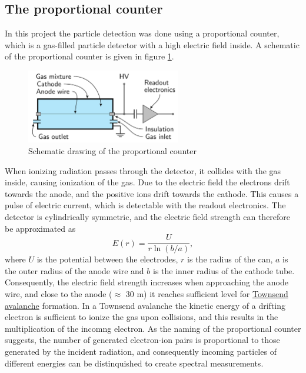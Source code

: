 \documentclass[a4paper]{article}
\begin{document}
\subsection{The proportional counter}
\label{counter}

In this project the particle detection was done using a proportional counter, which is a gas-filled particle detector with a high electric field inside.
\cite{instructions}
A schematic of the proportional counter is given in figure \ref{fig:theory_schematic}.

\begin{figure}[ht!]
\centering
\includegraphics[width=0.6\textwidth]{fig/article/schematic.png}
\caption{Schematic drawing of the proportional counter \cite{winkler_gaseous_2015}}
\label{fig:theory_schematic}
\end{figure}

When ionizing radiation passes through the detector, it collides with the gas inside, causing ionization of the gas.
Due to the electric field the electrons drift towards the anode, and the positive ions drift towards the cathode.
This causes a pulse of electric current, which is detectable with the readout electronics.
The detector is cylindrically symmetric, and the electric field strength can therefore be approximated as
\begin{equation}
E(r) = \frac{U}{r \ln(b/a) },
\end{equation}
where $U$ is the potential between the electrodes, $r$ is the radius of the can, $a$ is the outer radius of the anode wire and $b$ is the inner radius of the cathode tube.
Consequently, the electric field strength increases when approaching the anode wire, and close to the anode ($\approx$ 30 \textmu m) it reaches sufficient level for
\href{https://en.wikipedia.org/wiki/Townsend_discharge}{Townsend avalanche} formation.
In a Townsend avalanche the kinetic energy of a drifting electron is sufficient to ionize the gas upon collisions, and this results in the multiplication of the incomng electron.
As the naming of the proportional counter suggests, the number of generated electron-ion pairs is proportional to those generated by the incident radiation, and consequently incoming particles of different energies can be distinquished to create spectral measurements.
\cites{winkler_gaseous_2015}[p. 159--164]{knoll_radiation_2010}
\end{document}
